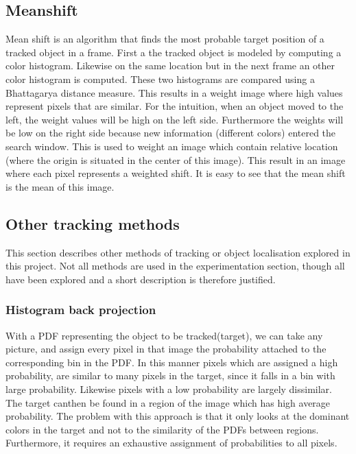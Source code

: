 \documentclass[a4paper,11pt]{article}
\begin{document}


		
\subsection{Meanshift}
Mean shift is an algorithm that finds the most probable target position of a tracked object in a frame. First a the tracked object is modeled by computing a color histogram. Likewise on the same location but in the next frame an other color histogram is computed. These two histograms are compared using a Bhattagarya distance measure. This results in a weight image where high values represent pixels that are similar.  For the intuition, when an object moved to the left, the weight values will be high on the left side. Furthermore the weights will be low on the right side because new information (different colors) entered the search window. 
This is used to weight an image which contain relative location (where the origin is situated in the center of this image). This result in an image where each pixel represents a weighted shift. It is easy to see that the mean shift is the mean of this image.

\subsection{Other tracking methods}
This section describes other methods of tracking or object localisation explored in this project. Not all methods are used in the experimentation section, though all have been explored and a short description is therefore justified.

\subsubsection{Histogram back projection}
With a PDF representing the object to be tracked(target), we can take any picture, and assign every pixel in that image the probability attached to the corresponding bin in the PDF. In this manner pixels which are assigned a high probability, are similar to many pixels in the target, since it falls in a bin with large probability. Likewise pixels with a low probability are largely dissimilar. The target canthen be found in a region of the image which has high average probability. The problem with this approach is that it only looks at the dominant colors in the target and not to the similarity of the PDFs between regions. Furthermore, it requires an exhaustive assignment of probabilities to all pixels.
\end{document}
